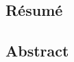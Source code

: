 
{}%
\pagestyle{plain}

\setlength{\headheight}{0.pt}
        


    
\subsection*{Résumé}











\begin{otherlanguage}{english}
%
\subsection*{Abstract}
\end{otherlanguage} 

